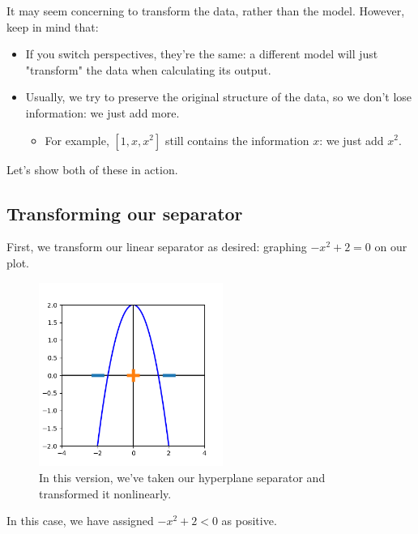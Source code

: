         It may seem concerning to transform the data, rather than the model. However, keep in mind that:

        \begin{itemize}
            \item If you switch perspectives, they're the same: a different model will just "transform" the data when calculating its output.
            
            \item Usually, we try to preserve the original structure of the data, so we don't lose information: we just add more.
                \begin{itemize}
                    \item For example, $[1,x,x^2]$ still contains the information $x$: we just add $x^2$.
                \end{itemize}
        \end{itemize}

        \miniex Let's show both of these in action.

        \subsecdiv

        \subsection*{Transforming our separator}
    
            First, we transform our linear separator as desired: graphing $-x^2+2=0$ on our plot. 
    
            \begin{figure}[H]
                \centering
                \includegraphics[width=60mm,scale=0.5]{images/feature_images/nonlinear_separator.png}
                \caption*{In this version, we've taken our hyperplane separator and transformed it nonlinearly.}
            \end{figure}
    
            In this case, we have assigned $-x^2+2<0$ as positive.
    
